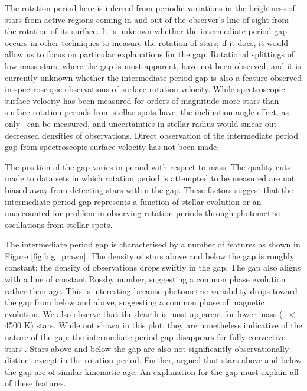 The rotation period here is inferred from periodic variations in the brightness of stars from active regions coming in and out of the observer's line of sight from the rotation of its surface.
It is unknown whether the intermediate period gap occurs in other techniques to measure the rotation of stars; if it does, it would allow us to focus on particular explanations for the gap.
Rotational splittings of low-mass stars, where the gap is most apparent, have not been observed, and it is currently unknown whether the intermediate period gap is also a feature observed in spectroscopic observations of surface rotation velocity.
While spectroscopic surface velocity has been measured for orders of magnitude more stars than surface rotation periods from stellar spots have, the inclination angle effect, as only \vsini\ can be measured, and uncertainties in stellar radius would smear out decreased densities of observations.
Direct observation of the intermediate period gap from spectroscopic surface velocity has not been made.

The position of the gap varies in period with respect to mass. 
The quality cuts made to data sets in which rotation period is attempted to be measured \citep[e.g., removing binaries and subgiants as in the analysis of ][]{mcquillan_rotation_2014, claytor_tess_2023} are not biased away from detecting stars within the gap.
These factors suggest that the intermediate period gap represents a function of stellar evolution or an unaccounted-for problem in observing rotation periods through photometric oscillations from stellar spots.

The intermediate period gap is characterised by a number of features as shown in Figure \ref{fig:big_prawn}.
The density of stars above and below the gap is roughly constant; the density of observations drops swiftly in the gap.
The gap also aligns with a line of constant Rossby number, suggesting a common phase evolution rather than age.
This is interesting because photometric variability drops toward the gap from below and above, suggesting a common phase of magnetic evolution.
We also observe that the dearth is most apparent for lower mass (\teff\ $<$ 4500 K) stars.
While not shown in this plot, they are nonetheless indicative of the nature of the gap: the intermediate period gap disappears for fully convective stars \citep{lu_bridging_2022}.
Stars above and below the gap are also not significantly observationally distinct except in the rotation period.
Further, \citet{lu_bridging_2022} argued that stars above and below the gap are of similar kinematic age.
An explanation for the gap must explain all of these features.

